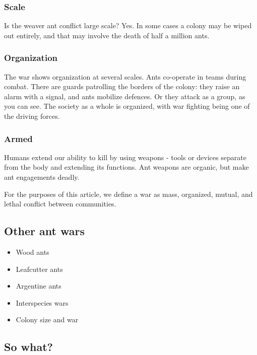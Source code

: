 \documentclass[
  letterpaper,
  DIV=11,
  numbers=noendperiod]{scrartcl}
\begin{document}
\hypertarget{scale}{%
\subsubsection{Scale}\label{scale}}

Is the weaver ant conflict large scale? Yes. In some cases a colony may
be wiped out entirely, and that may involve the death of half a million
ants.

\hypertarget{organization}{%
\subsubsection{Organization}\label{organization}}

The war shows organization at several scales. Ants co-operate in teams
during combat. There are guards patrolling the borders of the colony:
they raise an alarm with a signal, and ants mobilize defences. Or they
attack as a group, as you can see. The society as a whole is organized,
with war fighting being one of the driving forces.

\hypertarget{armed}{%
\subsubsection{Armed}\label{armed}}

Humans extend our ability to kill by using weapons - tools or devices
separate from the body and extending its functions. Ant weapons are
organic, but make ant engagements deadly.

For the purposes of this article, we define a war as mass, organized,
mutual, and lethal conflict between communities.

\hypertarget{other-ant-wars}{%
\subsection{Other ant wars}\label{other-ant-wars}}

\begin{itemize}
\item
  Wood ants
\item
  Leafcutter ants
\item
  Argentine ants
\item
  Interspecies wars
\item
  Colony size and war
\end{itemize}

\hypertarget{so-what}{%
\subsection{So what?}\label{so-what}}
\end{document}
